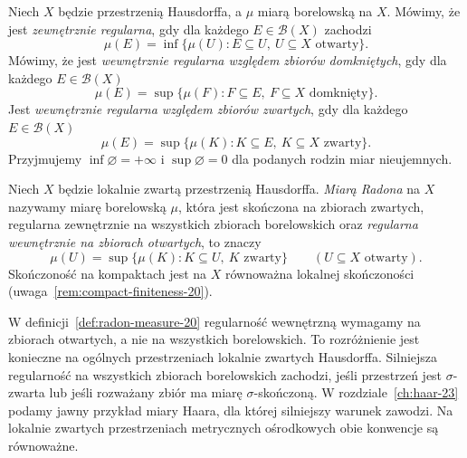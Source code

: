\begin{definicja}
\label{def:regularity-20}
Niech $X$ będzie przestrzenią Hausdorffa, a $\mu$ miarą
borelowską na $X$. Mówimy, że jest
\emph{zewnętrznie regularna}, gdy dla każdego
$E\in\mathcal B(X)$ zachodzi
\begin{equation}\label{eq:outer-regular-20}
 \mu(E)=\inf\{\mu(U):E\subseteq U,\ U\subseteq X
 \text{ otwarty}\}.
\end{equation}
Mówimy, że jest \emph{wewnętrznie regularna względem
zbiorów domkniętych}, gdy dla każdego $E\in\mathcal B(X)$
\[
 \mu(E)=\sup\{\mu(F):F\subseteq E,\ F\subseteq X
 \text{ domknięty}\}.
\]
Jest \emph{wewnętrznie regularna względem zbiorów zwartych},
gdy dla każdego $E\in\mathcal B(X)$
\begin{equation}\label{eq:inner-compact-20}
 \mu(E)=\sup\{\mu(K):K\subseteq E,\ K\subseteq X
 \text{ zwarty}\}.
\end{equation}
Przyjmujemy $\inf\varnothing=+\infty$ i
$\sup\varnothing=0$ dla podanych rodzin miar nieujemnych.
\end{definicja}

\begin{definicja}
\label{def:radon-measure-20}
Niech $X$ będzie lokalnie zwartą przestrzenią Hausdorffa.
\emph{Miarą Radona} na $X$ nazywamy miarę borelowską $\mu$,
która jest skończona na zbiorach zwartych, regularna
zewnętrznie na wszystkich zbiorach borelowskich oraz
\emph{regularna wewnętrznie na zbiorach otwartych}, to znaczy
\[
 \mu(U)=\sup\{\mu(K): K\subseteq U,\ K\text{ zwarty}\}
 \qquad(U\subseteq X\text{ otwarty}).
\]
Skończoność na kompaktach jest na $X$ równoważna
lokalnej skończoności (uwaga~\ref{rem:compact-finiteness-20}).
\end{definicja}

\begin{uwaga}
W definicji~\ref{def:radon-measure-20} regularność
wewnętrzną wymagamy na zbiorach otwartych, a nie na wszystkich
borelowskich. To rozróżnienie jest konieczne na ogólnych
przestrzeniach lokalnie zwartych Hausdorffa. Silniejsza
regularność na wszystkich zbiorach borelowskich zachodzi,
jeśli przestrzeń jest $\sigma$-zwarta lub jeśli rozważany
zbiór ma miarę $\sigma$-skończoną.
W rozdziale~\ref{ch:haar-23} podamy jawny przykład
miary Haara, dla której silniejszy warunek zawodzi.
Na lokalnie zwartych przestrzeniach metrycznych ośrodkowych
obie konwencje są równoważne.
\end{uwaga}

